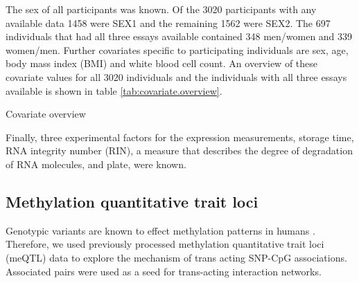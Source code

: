 \documentclass[a4paper,12pt,twoside,openright]{report}
\begin{document}
The sex of all participants was known. Of the 3020 participants with any available data 1458 were SEX1 and the remaining 1562 were SEX2. The 697 individuals that had all three essays available contained 348 men/women and 339 women/men.
Further covariates specific to participating individuals are sex, age, body mass index (BMI) and white blood cell count. An overview of these covariate values for all 3020 individuals and the individuals with all three essays available is shown in table \ref{tab:covariate.overview}.


\begin{table}[h!]
  	\begin{minipage}{.45\textwidth}
    \end{minipage}
    \hfill
     \begin{minipage}{.45\linewidth}
    \end{minipage}%
    \caption{Covariate overview}
	\label{tab:covariate.overview}
\end{table}

Finally, three experimental factors for the expression measurements, storage time, RNA integrity number (RIN), a measure that describes the degree of degradation of RNA molecules\cite{Schroeder2006}, and plate, were known.

\subsection{Methylation quantitative trait loci}
\label{Data:meQTL}
Genotypic variants are known to effect methylation patterns in humans \cite{}. Therefore, we used previously processed methylation quantitative trait loci (meQTL) data to explore the mechanism of trans acting SNP-CpG associations. Associated pairs were used as a seed for trans-acting interaction networks.
\end{document}
